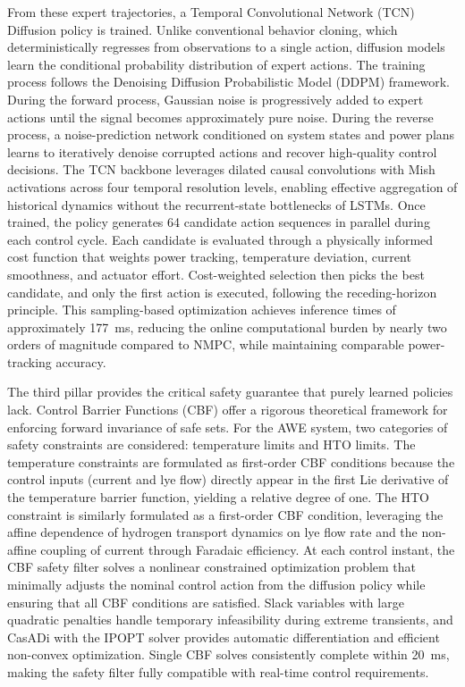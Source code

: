 \begin{digest}[en]
From these expert trajectories, a Temporal Convolutional Network (TCN) Diffusion policy is trained. Unlike conventional behavior cloning, which deterministically regresses from observations to a single action, diffusion models learn the conditional probability distribution of expert actions. The training process follows the Denoising Diffusion Probabilistic Model (DDPM) framework. During the forward process, Gaussian noise is progressively added to expert actions until the signal becomes approximately pure noise. During the reverse process, a noise-prediction network conditioned on system states and power plans learns to iteratively denoise corrupted actions and recover high-quality control decisions. The TCN backbone leverages dilated causal convolutions with Mish activations across four temporal resolution levels, enabling effective aggregation of historical dynamics without the recurrent-state bottlenecks of LSTMs. Once trained, the policy generates 64 candidate action sequences in parallel during each control cycle. Each candidate is evaluated through a physically informed cost function that weights power tracking, temperature deviation, current smoothness, and actuator effort. Cost-weighted selection then picks the best candidate, and only the first action is executed, following the receding-horizon principle. This sampling-based optimization achieves inference times of approximately 177~ms, reducing the online computational burden by nearly two orders of magnitude compared to NMPC, while maintaining comparable power-tracking accuracy.

The third pillar provides the critical safety guarantee that purely learned policies lack. Control Barrier Functions (CBF) offer a rigorous theoretical framework for enforcing forward invariance of safe sets. For the AWE system, two categories of safety constraints are considered: temperature limits and HTO limits. The temperature constraints are formulated as first-order CBF conditions because the control inputs (current and lye flow) directly appear in the first Lie derivative of the temperature barrier function, yielding a relative degree of one. The HTO constraint is similarly formulated as a first-order CBF condition, leveraging the affine dependence of hydrogen transport dynamics on lye flow rate and the non-affine coupling of current through Faradaic efficiency. At each control instant, the CBF safety filter solves a nonlinear constrained optimization problem that minimally adjusts the nominal control action from the diffusion policy while ensuring that all CBF conditions are satisfied. Slack variables with large quadratic penalties handle temporary infeasibility during extreme transients, and CasADi with the IPOPT solver provides automatic differentiation and efficient non-convex optimization. Single CBF solves consistently complete within 20~ms, making the safety filter fully compatible with real-time control requirements.


\end{digest}
